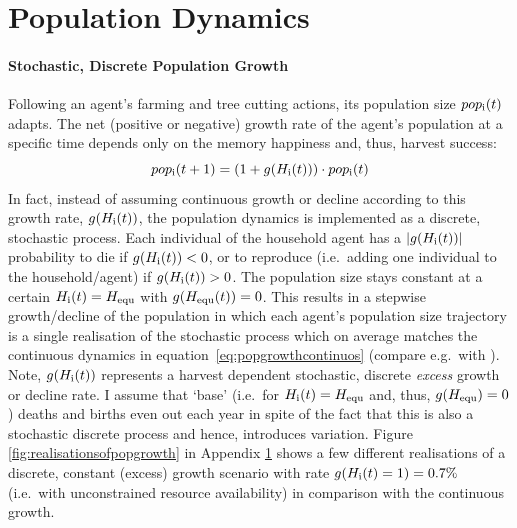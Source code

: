 \FloatBarrier
\section{Population Dynamics}\label{sec:PopGrowth}
\paragraph{Stochastic, Discrete Population Growth}
Following an agent's farming and tree cutting actions, its population size $pop_{\rm i}(t)$ adapts. 
The net (positive or negative) growth rate of the agent's population at a specific time depends only on the memory happiness and, thus, harvest success:
\begin{equation}\label{eq:popgrowthcontinuos}
pop_{\rm i}(t+1) = (1+g(H_{\rm i}(t))) \cdot pop_{\rm i}(t)
\end{equation}
In fact, instead of assuming continuous growth or decline according to this growth rate, $g(H_{\rm i}(t))$, the population dynamics is implemented as a discrete, stochastic process.
Each individual of the household agent has a $|g(H_{\rm i}(t))|$ probability to die if $g(H_{\rm i}(t))<0$, or %
to reproduce (i.e.\ adding one individual to the household/agent) if $g(H_{\rm i}(t))>0$.
The population size stays constant at a certain $H_{\rm i}(t) = H_{\rm equ}$ with $g(H_{\rm equ}(t))=0$. 
This results in a stepwise growth/decline of the population in which each agent's population size trajectory is a single realisation of the stochastic process which on average matches the continuous dynamics in equation~\ref{eq:popgrowthcontinuos} (compare e.g.\ with \cite{Bungartz2009}).
Note, $g(H_{\rm i}(t))$ represents a harvest dependent stochastic, discrete \textit{excess} growth or decline rate. 
I assume that `base' (i.e.\ for $H_{\rm i}(t) = H_{\rm equ}$ and, thus, $g(H_{\rm equ})=0$) deaths and births even out each year in spite of the fact that this is also a stochastic discrete process \citep{Bungartz2009} and hence, introduces variation.
Figure \ref{fig:realisationsofpopgrowth} in Appendix \ref{sec:PopGrowth} shows a few different realisations of a discrete, constant (excess) growth scenario with rate $g(H_{\rm i}(t)=1)=0.7\%$ (i.e.\ with unconstrained resource availability) in comparison with the continuous growth.


